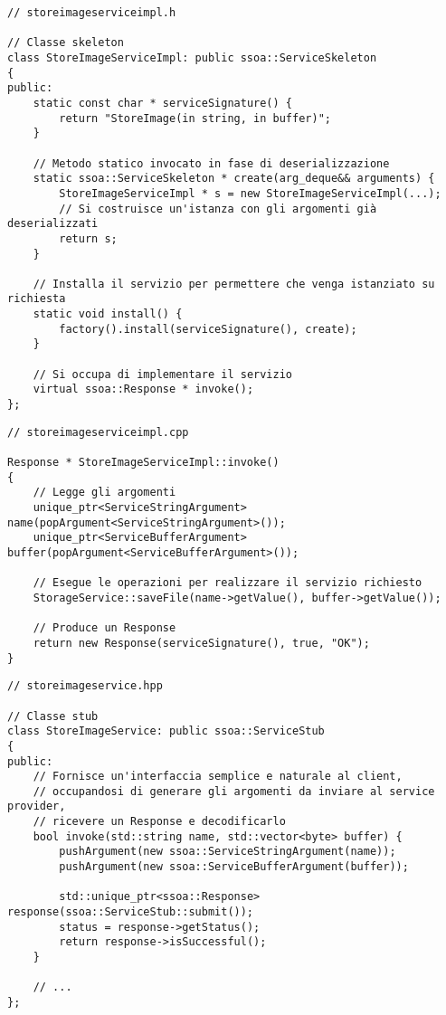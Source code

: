 \documentclass[a4paper,twoside]{article}
\begin{document}
\begin{lstlisting}
// storeimageserviceimpl.h

// Classe skeleton
class StoreImageServiceImpl: public ssoa::ServiceSkeleton
{
public:
    static const char * serviceSignature() {
        return "StoreImage(in string, in buffer)";
    }

    // Metodo statico invocato in fase di deserializzazione
    static ssoa::ServiceSkeleton * create(arg_deque&& arguments) {
        StoreImageServiceImpl * s = new StoreImageServiceImpl(...);
        // Si costruisce un'istanza con gli argomenti già deserializzati
        return s;
    }

    // Installa il servizio per permettere che venga istanziato su richiesta
    static void install() {
        factory().install(serviceSignature(), create);
    }

    // Si occupa di implementare il servizio
    virtual ssoa::Response * invoke();
};
\end{lstlisting}

\begin{lstlisting}
// storeimageserviceimpl.cpp

Response * StoreImageServiceImpl::invoke()
{
    // Legge gli argomenti
    unique_ptr<ServiceStringArgument> name(popArgument<ServiceStringArgument>());
    unique_ptr<ServiceBufferArgument> buffer(popArgument<ServiceBufferArgument>());

    // Esegue le operazioni per realizzare il servizio richiesto
    StorageService::saveFile(name->getValue(), buffer->getValue());

    // Produce un Response
    return new Response(serviceSignature(), true, "OK");
}
\end{lstlisting}


\begin{lstlisting}
// storeimageservice.hpp

// Classe stub
class StoreImageService: public ssoa::ServiceStub
{
public:
    // Fornisce un'interfaccia semplice e naturale al client,
    // occupandosi di generare gli argomenti da inviare al service provider,
    // ricevere un Response e decodificarlo
    bool invoke(std::string name, std::vector<byte> buffer) {
        pushArgument(new ssoa::ServiceStringArgument(name));
        pushArgument(new ssoa::ServiceBufferArgument(buffer));

        std::unique_ptr<ssoa::Response> response(ssoa::ServiceStub::submit());
        status = response->getStatus();
        return response->isSuccessful();
    }

    // ...
};
\end{lstlisting}
\end{document}
